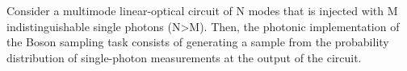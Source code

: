 \documentclass[preview]{standalone}\usepackage[english]{babel}\usepackage{amsmath}\usepackage{amssymb}\usepackage{dsfont}\usepackage{setspace}\usepackage{tipa}\usepackage{relsize}\usepackage{textcomp}\usepackage{mathrsfs}\usepackage{calligra}\usepackage{wasysym}\usepackage{ragged2e}\usepackage{physics}\usepackage{xcolor}\usepackage{microtype}\linespread{1}
\begin{document}
Consider a multimode linear-optical circuit of N modes 
        that is injected with M indistinguishable single photons (N>M). 
        Then, the photonic implementation of the Boson sampling task 
        consists of generating a sample from the probability 
        distribution of single-photon measurements at the output 
        of the circuit.
\end{document}
